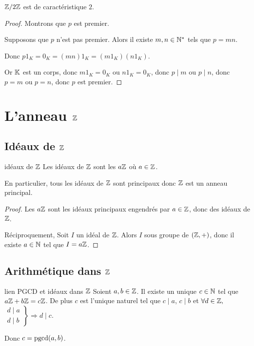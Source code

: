 \begin{exemple}
    $\mathbb{Z} / 2 \mathbb{Z}$ est de caractéristique $2$.
\end{exemple}


\begin{proof}
    Montrons que $p$ est premier. 

    Supposons que $p$ n'est pas premier. Alors il existe $m, n \in \mathbb{N}^*$ tels que 
    $p = mn$. 

    Donc $p1_K = 0_K = (mn)1_K = (m1_K)(n1_K)$.

    Or $\mathbb{K}$ est un corps, donc $m1_K = 0_K$ ou $n1_K = 0_K$, 
    donc $p \mid m$ ou $p \mid n$, donc $p = m$ ou $p = n$, donc $p$ est premier.
\end{proof}

\section{L'anneau \texorpdfstring{$\mathbb{Z}$}{Z}}
\subsection{Idéaux de \texorpdfstring{$\mathbb{Z}$}{Z}}

\begin{theoreme}{idéaux de $\mathbb{Z}$}{}
    Les idéaux de $\mathbb{Z}$ sont les $a \mathbb{Z}$ où $a \in \mathbb{Z}$.

    En particulier, tous les idéaux de $\mathbb{Z}$ sont principaux donc $\mathbb{Z}$ est un anneau principal.
\end{theoreme}

\begin{proof}
    Les $a \mathbb{Z}$ sont les idéaux principaux engendrés par $a \in \mathbb{Z}$, donc des idéaux de $\mathbb{Z}$.

    Réciproquement, Soit $I$ un idéal de $\mathbb{Z}$. Alors $I$ sous groupe de $(\mathbb{Z}, +)$, donc il existe 
    $a \in \mathbb{N}$ tel que $I = a \mathbb{Z}$.
\end{proof}

\subsection{Arithmétique dans \texorpdfstring{$\mathbb{Z}$}{Z}}

\begin{theoreme}{lien PGCD et idéaux dans $\mathbb{Z}$}{}
    Soient $a, b \in \mathbb{Z}$. Il existe un unique $c \in \mathbb{N}$ tel que $a \mathbb{Z} + b \mathbb{Z} = c \mathbb{Z}$. 
    De plus $c$ est l'unique naturel tel que $c \mid a $, $c \mid b$ et $\forall d \in \mathbb{Z}, $
    $\left. \begin{aligned}
        d \mid a \\
        d \mid b
    \end{aligned} \right\} \Rightarrow d \mid c$.

    Donc $c = \operatorname{pgcd}(a, b)$.
\end{theoreme}


